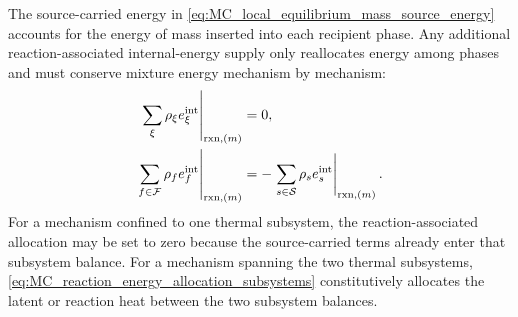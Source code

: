 The source-carried energy in
\eqref{eq:MC_local_equilibrium_mass_source_energy} accounts for the energy of
mass inserted into each recipient phase.  Any additional reaction-associated
internal-energy supply only reallocates energy among phases and must conserve
mixture energy mechanism by mechanism:
%
\begin{subequations}
	\label{eq:MC_reaction_energy_allocation}
	\begin{align}
		\left.
		\sum_\xi\rho_\xi e_\xi^{\rm int}
		\right\vert_{{\rm rxn},(m)}
		 & =0,
		\label{eq:MC_reaction_energy_allocation_mixture} \\
		\left.
		\sum_{f\in\mathcal{F}}\rho_f e_f^{\rm int}
		\right\vert_{{\rm rxn},(m)}
		 & =
		-
		\left.
		\sum_{s\in\mathcal{S}}\rho_s e_s^{\rm int}
		\right\vert_{{\rm rxn},(m)} .
		\label{eq:MC_reaction_energy_allocation_subsystems}
	\end{align}
\end{subequations}
%
For a mechanism confined to one thermal subsystem, the reaction-associated
allocation may be set to zero because the source-carried terms already enter
that subsystem balance.  For a mechanism spanning the two thermal subsystems,
\eqref{eq:MC_reaction_energy_allocation_subsystems} constitutively allocates
the latent or reaction heat between the two subsystem balances.

